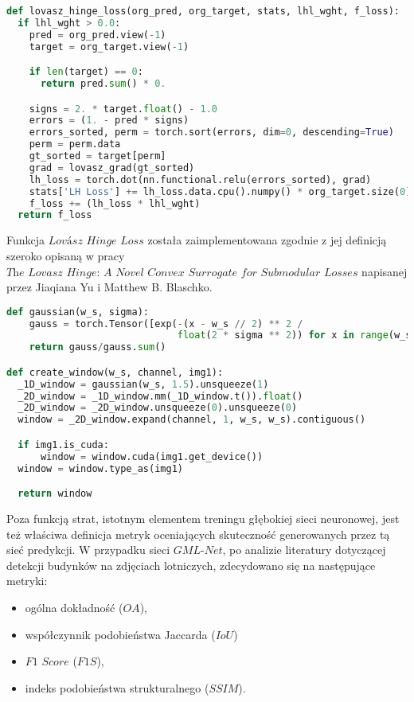 \cell
\begin{lstlisting}[name=Rozdzial3.1, language=Python]
def lovasz_hinge_loss(org_pred, org_target, stats, lhl_wght, f_loss):
  if lhl_wght > 0.0:
    pred = org_pred.view(-1)
    target = org_target.view(-1)

    if len(target) == 0:
      return pred.sum() * 0.

    signs = 2. * target.float() - 1.0
    errors = (1. - pred * signs)
    errors_sorted, perm = torch.sort(errors, dim=0, descending=True)
    perm = perm.data
    gt_sorted = target[perm]
    grad = lovasz_grad(gt_sorted)
    lh_loss = torch.dot(nn.functional.relu(errors_sorted), grad)
    stats['LH Loss'] += lh_loss.data.cpu().numpy() * org_target.size(0)
    f_loss += (lh_loss * lhl_wght)
  return f_loss
\end{lstlisting}


\cell
Funkcja $\textit{Lovász Hinge Loss}$ została zaimplementowana zgodnie z jej definicją szeroko opisaną w pracy $\textit{The Lovasz Hinge: A Novel Convex Surrogate for Submodular Losses}$ napisanej przez Jiaqiana Yu i Matthew B. Blaschko.

\cell
\begin{lstlisting}[name=Rozdzial3.1, language=Python]
def gaussian(w_s, sigma):
    gauss = torch.Tensor([exp(-(x - w_s // 2) ** 2 / 
                              float(2 * sigma ** 2)) for x in range(w_s)])
    return gauss/gauss.sum()

def create_window(w_s, channel, img1):
  _1D_window = gaussian(w_s, 1.5).unsqueeze(1)
  _2D_window = _1D_window.mm(_1D_window.t()).float()
  _2D_window = _2D_window.unsqueeze(0).unsqueeze(0)
  window = _2D_window.expand(channel, 1, w_s, w_s).contiguous()

  if img1.is_cuda:
      window = window.cuda(img1.get_device())
  window = window.type_as(img1)

  return window
\end{lstlisting}


\cell
Poza funkcją strat, istotnym elementem treningu głębokiej sieci neuronowej, jest też właściwa definicja metryk oceniających skuteczność generowanych przez tą sieć predykcji. W przypadku sieci $\textit{GML-Net}$, po analizie literatury dotyczącej detekcji budynków na zdjęciach lotniczych, zdecydowano się na następujące metryki:

\begin{itemize}
  \item ogólna dokładność ($\textit{OA}$),
  \item współczynnik podobieństwa Jaccarda ($\textit{IoU}$)
  \item $\textit{F1 Score}$ ($\textit{F1S}$),
  \item indeks podobieństwa strukturalnego ($\textit{SSIM}$).


\end{itemize}

